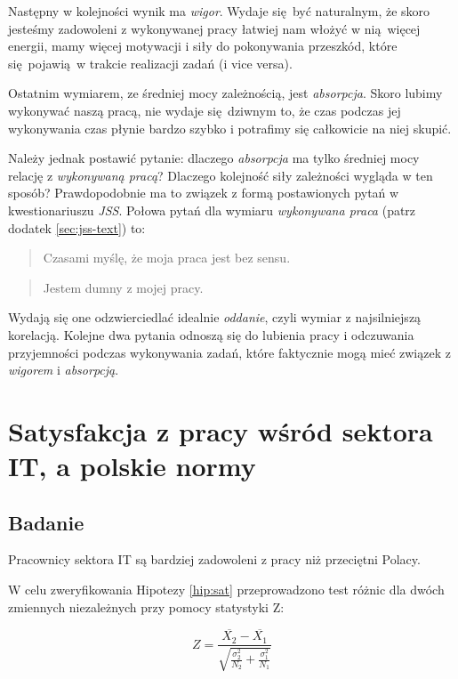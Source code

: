 Następny w kolejności wynik ma \textit{wigor}. Wydaje się być naturalnym, że skoro jesteśmy zadowoleni z wykonywanej pracy łatwiej nam włożyć w nią więcej energii, mamy więcej motywacji i siły do pokonywania przeszkód, które się pojawią w trakcie
realizacji zadań (i vice versa). 

Ostatnim wymiarem, ze średniej mocy zależnością, jest \textit{absorpcja}. Skoro lubimy wykonywać naszą pracą, nie wydaje się dziwnym to, że czas podczas jej wykonywania czas płynie bardzo szybko i potrafimy się całkowicie na niej skupić. 

Należy jednak postawić pytanie: dlaczego \textit{absorpcja} ma tylko średniej mocy relację z \textit{wykonywaną pracą}? Dlaczego kolejność siły zależności wygląda w ten sposób? Prawdopodobnie ma to związek z formą postawionych pytań w kwestionariuszu \emph{JSS}. Połowa pytań dla wymiaru \textit{wykonywana praca} (patrz dodatek \ref{sec:jss-text}) to:
\begin{quote}
  Czasami myślę, że moja praca jest bez sensu.
\end{quote}
\begin{quote}
  Jestem dumny z mojej pracy.
\end{quote}
Wydają się one odzwierciedlać idealnie \textit{oddanie}, czyli wymiar z najsilniejszą korelacją. Kolejne dwa pytania odnoszą się do lubienia pracy i odczuwania przyjemności podczas wykonywania zadań, które faktycznie mogą mieć związek z \textit{wigorem} i \textit{absorpcją}.


\section{Satysfakcja z pracy wśród sektora IT, a polskie normy}
\subsection{Badanie}
\begin{hyp}
  Pracownicy sektora IT są bardziej zadowoleni z pracy niż przeciętni Polacy.
  \label{hip:sat}
\end{hyp}

W celu zweryfikowania Hipotezy \ref{hip:sat} przeprowadzono test różnic dla dwóch zmiennych niezależnych przy pomocy statystyki Z:

\begin{equation}
  Z = \frac{\overline{X_2} - \overline{X_1}}{\sqrt{\frac{\sigma^2_2}{N_2}+\frac{\sigma^2_1}{N_1}}}
\end{equation}

